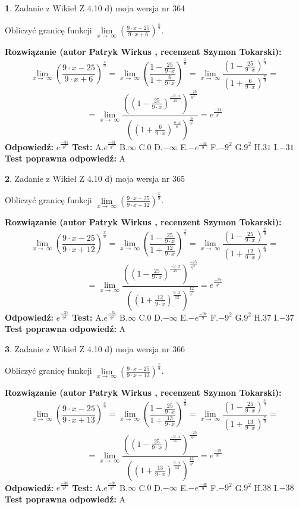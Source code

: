 \documentclass[12pt, a4paper]{article}
\theoremstyle{definition} %
\newtheorem{zad}{}
\newcommand{\zadStart}[1]{\begin{zad}#1\newline}
\newcommand{\zadStop}{\end{zad}}
\newcommand{\rozwStart}[2]{\noindent \textbf{Rozwiązanie (autor #1 , recenzent #2): }\newline}
\newcommand{\rozwStop}{\newline}
\newcommand{\odpStart}{\noindent \textbf{Odpowiedź:}\newline}
\newcommand{\odpStop}{\newline}
\newcommand{\testStart}{\noindent \textbf{Test:}\newline}
\newcommand{\testStop}{\newline}
\newcommand{\kluczStart}{\noindent \textbf{Test poprawna odpowiedź:}\newline}
\newcommand{\kluczStop}{\newline}
\begin{document}
\zadStart{Zadanie z Wikieł Z 4.10 d) moja wersja nr 364}


Obliczyć granicę funkcji  $\lim\limits_{x\to\ \infty}(\frac{9\cdot x-25}{9\cdot x+6})^{\frac{x}{9}}$.
\zadStop
\rozwStart{Patryk Wirkus}{Szymon Tokarski}
$$\lim\limits_{x\to\ \infty}(\frac{9\cdot x-25}{9\cdot x+6})^{\frac{x}{9}} = \lim\limits_{x\to\ \infty}(\frac{1-\frac{25}{9\cdot x}}{1+\frac{6}{9\cdot x}})^{\frac{x}{9}}=\lim\limits_{x\to\ \infty}\frac{(1-\frac{25}{9\cdot x})^{\frac{x}{9}}}{(1+\frac{6}{9\cdot x})^{\frac{x}{9}}}=$$
$$=\lim\limits_{x\to\ \infty}\frac{((1-\frac{25}{9\cdot x})^{\frac{-9\cdot x}{25}})^{\frac{-25}{9^{2}}}}{((1+\frac{6}{9\cdot x})^{\frac{9\cdot x}{6}})^{\frac{6}{9^{2}}}}=e^{\frac{-31}{9^{2}}}$$
\rozwStop
\odpStart
$e^{\frac{-31}{9^{2}}}$
\odpStop
\testStart
A.$e^{\frac{-31}{9^{2}}}$ B.$\infty$ C.$0$ D.$-\infty$ E.$-e^{\frac{-31}{9}}$
F.$-9^{2}$ G.$9^{2}$
H.$31$
I.$-31$
\testStop
\kluczStart
A
\kluczStop



\zadStart{Zadanie z Wikieł Z 4.10 d) moja wersja nr 365}


Obliczyć granicę funkcji  $\lim\limits_{x\to\ \infty}(\frac{9\cdot x-25}{9\cdot x+12})^{\frac{x}{9}}$.
\zadStop
\rozwStart{Patryk Wirkus}{Szymon Tokarski}
$$\lim\limits_{x\to\ \infty}(\frac{9\cdot x-25}{9\cdot x+12})^{\frac{x}{9}} = \lim\limits_{x\to\ \infty}(\frac{1-\frac{25}{9\cdot x}}{1+\frac{12}{9\cdot x}})^{\frac{x}{9}}=\lim\limits_{x\to\ \infty}\frac{(1-\frac{25}{9\cdot x})^{\frac{x}{9}}}{(1+\frac{12}{9\cdot x})^{\frac{x}{9}}}=$$
$$=\lim\limits_{x\to\ \infty}\frac{((1-\frac{25}{9\cdot x})^{\frac{-9\cdot x}{25}})^{\frac{-25}{9^{2}}}}{((1+\frac{12}{9\cdot x})^{\frac{9\cdot x}{12}})^{\frac{12}{9^{2}}}}=e^{\frac{-37}{9^{2}}}$$
\rozwStop
\odpStart
$e^{\frac{-37}{9^{2}}}$
\odpStop
\testStart
A.$e^{\frac{-37}{9^{2}}}$ B.$\infty$ C.$0$ D.$-\infty$ E.$-e^{\frac{-37}{9}}$
F.$-9^{2}$ G.$9^{2}$
H.$37$
I.$-37$
\testStop
\kluczStart
A
\kluczStop



\zadStart{Zadanie z Wikieł Z 4.10 d) moja wersja nr 366}


Obliczyć granicę funkcji  $\lim\limits_{x\to\ \infty}(\frac{9\cdot x-25}{9\cdot x+13})^{\frac{x}{9}}$.
\zadStop
\rozwStart{Patryk Wirkus}{Szymon Tokarski}
$$\lim\limits_{x\to\ \infty}(\frac{9\cdot x-25}{9\cdot x+13})^{\frac{x}{9}} = \lim\limits_{x\to\ \infty}(\frac{1-\frac{25}{9\cdot x}}{1+\frac{13}{9\cdot x}})^{\frac{x}{9}}=\lim\limits_{x\to\ \infty}\frac{(1-\frac{25}{9\cdot x})^{\frac{x}{9}}}{(1+\frac{13}{9\cdot x})^{\frac{x}{9}}}=$$
$$=\lim\limits_{x\to\ \infty}\frac{((1-\frac{25}{9\cdot x})^{\frac{-9\cdot x}{25}})^{\frac{-25}{9^{2}}}}{((1+\frac{13}{9\cdot x})^{\frac{9\cdot x}{13}})^{\frac{13}{9^{2}}}}=e^{\frac{-38}{9^{2}}}$$
\rozwStop
\odpStart
$e^{\frac{-38}{9^{2}}}$
\odpStop
\testStart
A.$e^{\frac{-38}{9^{2}}}$ B.$\infty$ C.$0$ D.$-\infty$ E.$-e^{\frac{-38}{9}}$
F.$-9^{2}$ G.$9^{2}$
H.$38$
I.$-38$
\testStop
\kluczStart
A
\kluczStop
\end{document}
